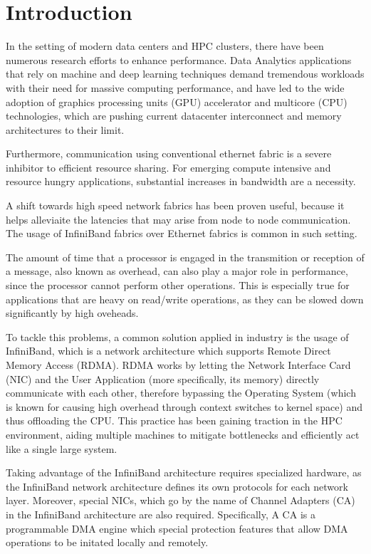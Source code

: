 \section{Introduction}

In the setting of modern data centers and HPC clusters, there have been numerous research efforts
to enhance performance. Data Analytics applications that rely on machine and deep learning techniques demand
tremendous workloads with their need for massive computing performance, and have led to the wide adoption of graphics
processing units (GPU) accelerator and multicore (CPU) technologies, which are pushing current datacenter interconnect
and memory architectures to their limit\cite{shalf19}.

Furthermore, communication using conventional ethernet fabric is a severe inhibitor to efficient resource sharing.
For emerging compute intensive and resource hungry applications, substantial increases in bandwidth are a necessity\cite{shalf19}.

A shift towards high speed network fabrics has been proven useful,
because it helps alleviaite the latencies that may arise from node to node communication.
The usage of InfiniBand fabrics over Ethernet fabrics is common in such setting.

The amount of time that a processor is engaged in the transmition or reception of a message, also known as overhead,
can also play a major role in performance, since the processor cannot perform other operations.
This is especially true for applications that are heavy on read/write operations, as they can
be slowed down significantly by high oveheads.\cite{martin97}

To tackle this problems, a common solution applied in industry is the usage of InfiniBand, which
is a network architecture which supports Remote Direct Memory Access (RDMA).
RDMA works by letting the Network Interface Card (NIC) and the User Application (more specifically, its memory)
directly communicate with each other, therefore bypassing the Operating System (which is known for
causing high overhead through context switches to kernel space) and thus offloading the CPU. This practice has been
gaining traction in the HPC environment, aiding multiple machines to mitigate bottlenecks and efficiently act like a
single large system.

Taking advantage of the InfiniBand architecture requires specialized hardware, as the InfiniBand network architecture defines
its own protocols for each network layer. Moreover, special NICs, which go by the name of Channel Adapters (CA) in the InfiniBand
architecture are also required. Specifically, A CA is a programmable DMA engine which special protection features that allow
DMA operations to be initated locally and remotely\cite{infinibandvol107}.

